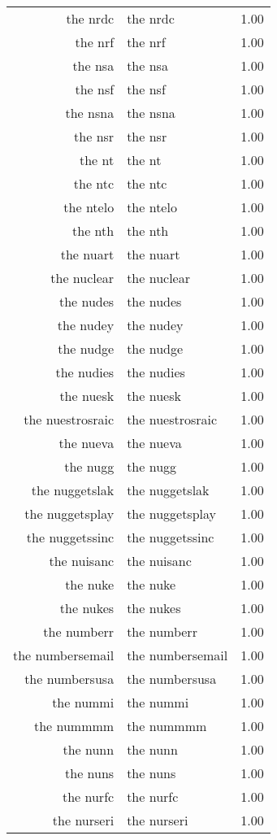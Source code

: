 \begin{table}[ht]
\begin{tabular}{rlr}
  the nrdc & the nrdc & 1.00 \\ 
  the nrf & the nrf & 1.00 \\ 
  the nsa & the nsa & 1.00 \\ 
  the nsf & the nsf & 1.00 \\ 
  the nsna & the nsna & 1.00 \\ 
  the nsr & the nsr & 1.00 \\ 
  the nt & the nt & 1.00 \\ 
  the ntc & the ntc & 1.00 \\ 
  the ntelo & the ntelo & 1.00 \\ 
  the nth & the nth & 1.00 \\ 
  the nuart & the nuart & 1.00 \\ 
  the nuclear & the nuclear & 1.00 \\ 
  the nudes & the nudes & 1.00 \\ 
  the nudey & the nudey & 1.00 \\ 
  the nudge & the nudge & 1.00 \\ 
  the nudies & the nudies & 1.00 \\ 
  the nuesk & the nuesk & 1.00 \\ 
  the nuestrosraic & the nuestrosraic & 1.00 \\ 
  the nueva & the nueva & 1.00 \\ 
  the nugg & the nugg & 1.00 \\ 
  the nuggetslak & the nuggetslak & 1.00 \\ 
  the nuggetsplay & the nuggetsplay & 1.00 \\ 
  the nuggetssinc & the nuggetssinc & 1.00 \\ 
  the nuisanc & the nuisanc & 1.00 \\ 
  the nuke & the nuke & 1.00 \\ 
  the nukes & the nukes & 1.00 \\ 
  the numberr & the numberr & 1.00 \\ 
  the numbersemail & the numbersemail & 1.00 \\ 
  the numbersusa & the numbersusa & 1.00 \\ 
  the nummi & the nummi & 1.00 \\ 
  the nummmm & the nummmm & 1.00 \\ 
  the nunn & the nunn & 1.00 \\ 
  the nuns & the nuns & 1.00 \\ 
  the nurfc & the nurfc & 1.00 \\ 
  the nurseri & the nurseri & 1.00 \\ 

\end{tabular}
\end{table}

